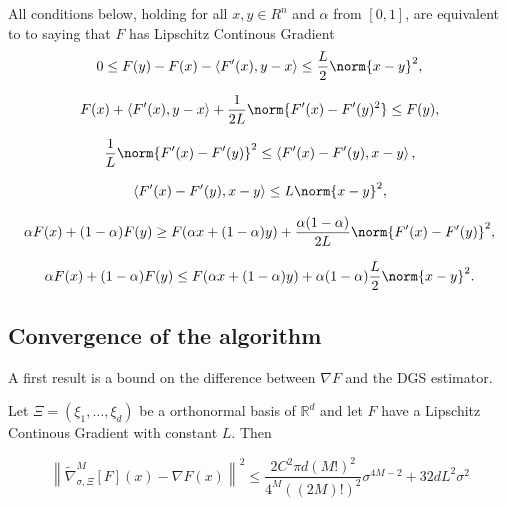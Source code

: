 \begin{prop}\label{TeoremaNesterov}
All conditions below, holding for all $ x, y \in R^{n} $ and $ \alpha $ from $ [0,1] $, are equivalent to to saying that $F$ has Lipschitz Continous Gradient
\begin{equation}
0 \leq F(y)-F(x)-\left\langle F^{\prime}(x), y-x\right\rangle \leq \frac{L}{2}\norm{x-y}^{2},
\end{equation}

\begin{equation}
F(x)+\left\langle F^{\prime}(x), y-x\right\rangle+\frac{1}{2 L}\norm{F^{\prime}(x)-F^{\prime}(y)^{2}} \leq F(y),    
\end{equation}

\begin{equation}
\frac{1}{L}\norm{F^{\prime}(x)-F^{\prime}(y)}^{2} \leq\left\langle F^{\prime}(x)-F^{\prime}(y), x-y\right\rangle,    
\end{equation}

\begin{equation}
\left\langle F^{\prime}(x)-F^{\prime}(y), x-y\right\rangle \leq L\norm{x-y}^{2},  
\end{equation}

\begin{equation}
\alpha F(x)+(1-\alpha) F(y) \geq F(\alpha x+(1-\alpha) y) + \frac{\alpha(1-\alpha)}{2 L}\norm{F^{\prime}(x)-F^{\prime}(y)}^{2},   
\end{equation}

\begin{equation}
\alpha F(x)+(1-\alpha) F(y) \leq F(\alpha x+(1-\alpha) y) +\alpha(1-\alpha) \frac{L}{2}\norm{x-y}^{2}.   
\end{equation}

\end{prop}

\subsection{Convergence of the algorithm}

A first result is a bound on the difference between $\nabla F$ and the DGS estimator.

\begin{prop}\label{DGSEstimatorBound}

Let $\Xi = \left(\xi_1,\dots,\xi_d\right)$ be a orthonormal basis of $\mathbb{R}^d$ and let $F$ have a Lipschitz Continous Gradient with constant $L$. Then

\begin{equation}\label{BoundErrorEstimatorEq}
 \left\|\widetilde{\nabla}_{\sigma, \Xi}^{M}[F](x)-\nabla F(x)\right\|^{2} \leq \frac{2 C^{2} \pi d(M !)^{2}}{4^{M}((2 M) !)^{2}} \sigma^{4 M-2}+32 d L^{2} \sigma^{2} 
\end{equation}

\end{prop}

